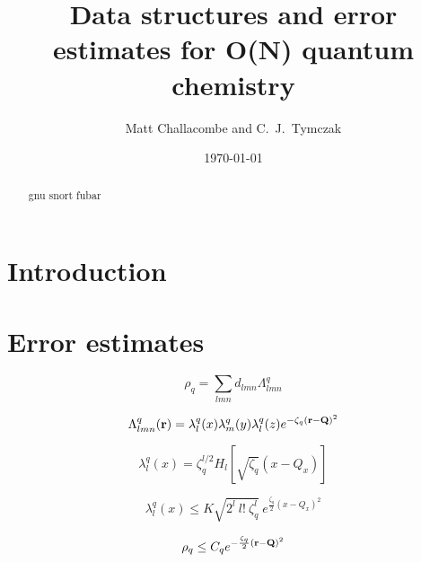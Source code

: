 \commentoutA{\documentclass[superbib,prb,epsfig,floats,twocolumn]{revtex4}}
\begin{document}





\date{\today}

\title{Data structures and error estimates for O(N) quantum chemistry}

\author{Matt Challacombe and  C.~J.~Tymczak}

\address{
Theoretical Division, Los Alamos National Laboratory,
Los Alamos, NM 87545, USA}


\begin{abstract}
gnu snort fubar

\end{abstract}

\maketitle

\section{Introduction}

\section{Error estimates}

\begin{equation}
\rho_q = \sum_{lmn} d_{lmn} \Lambda^q_{lmn}
\end{equation}

\begin{equation}
\Lambda^q_{lmn}({\bf r})=\lambda^q_l(x)\lambda^q_m(y) \lambda^q_l(z) e^{-\zeta_q ({\bf r -Q})^2}
\end{equation}

\begin{equation}
\lambda^q_l(x)= \zeta^{l/2}_q H_l \left[ \sqrt{\zeta_q} \left( x-Q_x \right)\right]
\end{equation}

\begin{equation}
\lambda^q_l(x) \leq K \sqrt{ 2^l ~ l!~ \zeta^l_q  } ~ e^{\frac{\zeta_q}{2} (x-Q_x)^2 } 
\end{equation}

\begin{equation}
\rho_q \leq C_q e^{ -\frac{\zeta_q}{2} ({\bf r -Q})^2 }  
\end{equation}
\end{document}
